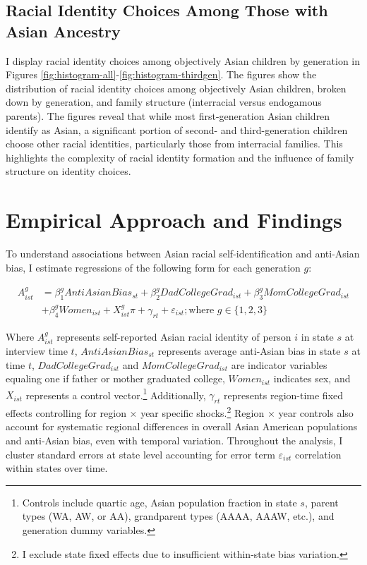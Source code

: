 \subsection{Racial Identity Choices Among Those with Asian Ancestry}
I display racial identity choices among objectively Asian children by generation in Figures \ref{fig:histogram-all}-\ref{fig:histogram-thirdgen}. The figures show the distribution of racial identity choices among objectively Asian children, broken down by generation, and family structure (interracial versus endogamous parents). The figures reveal that while most first-generation Asian children identify as Asian, a significant portion of second- and third-generation children choose other racial identities, particularly those from interracial families. This highlights the complexity of racial identity formation and the influence of family structure on identity choices.

\section{Empirical Approach and Findings}\label{sec:empstrat}

To understand associations between Asian racial self-identification and anti-Asian bias, I estimate regressions of the following form for each generation $g$:

\begin{align}
A_{ist}^g &= \beta_1^g AntiAsianBias_{st} + \beta_2^g DadCollegeGrad_{ist} + \beta_3^g MomCollegeGrad_{ist} \nonumber \\ 
            &+ \beta_4^g Women_{ist} + X_{ist}^g\pi + \gamma_{rt} 
           + \varepsilon_{ist}; 
           \text{where } g \in \{1,2,3\} \label{eq:identity_reg_bias}
\end{align}

Where $A_{ist}^g$ represents self-reported Asian racial identity of person $i$ in state $s$ at interview time $t$, $AntiAsianBias_{st}$ represents average anti-Asian bias in state $s$ at time $t$, $DadCollegeGrad_{ist}$ and $MomCollegeGrad_{ist}$ are indicator variables equaling one if father or mother graduated college, $Women_{ist}$ indicates sex, and $X_{ist}$ represents a control vector.\footnote{Controls include quartic age, Asian population fraction in state $s$, parent types (WA, AW, or AA), grandparent types (AAAA, AAAW, etc.), and generation dummy variables.} Additionally, $\gamma_{rt}$ represents region-time fixed effects controlling for region $\times$ year specific shocks.\footnote{I exclude state fixed effects due to insufficient within-state bias variation.} Region $\times$ year controls also account for systematic regional differences in overall Asian American populations and anti-Asian bias, even with temporal variation. Throughout the analysis, I cluster standard errors at state level accounting for error term $\varepsilon_{ist}$ correlation within states over time.

